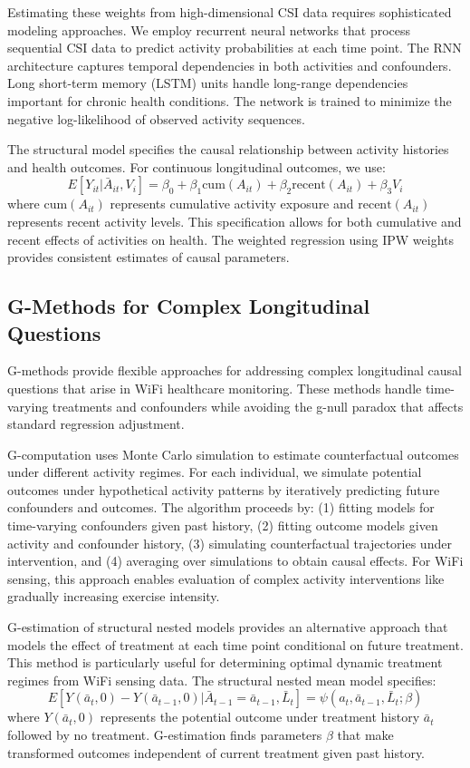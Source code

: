 \documentclass[journal]{IEEEtran}
\begin{document}
Estimating these weights from high-dimensional CSI data requires sophisticated modeling approaches. We employ recurrent neural networks that process sequential CSI data to predict activity probabilities at each time point. The RNN architecture captures temporal dependencies in both activities and confounders. Long short-term memory (LSTM) units handle long-range dependencies important for chronic health conditions. The network is trained to minimize the negative log-likelihood of observed activity sequences.

The structural model specifies the causal relationship between activity histories and health outcomes. For continuous longitudinal outcomes, we use:
$$E[Y_{it} | \bar{A}_{it}, V_i] = \beta_0 + \beta_1 \text{cum}(A_{it}) + \beta_2 \text{recent}(A_{it}) + \beta_3 V_i$$
where $\text{cum}(A_{it})$ represents cumulative activity exposure and $\text{recent}(A_{it})$ represents recent activity levels. This specification allows for both cumulative and recent effects of activities on health. The weighted regression using IPW weights provides consistent estimates of causal parameters.

\subsection{G-Methods for Complex Longitudinal Questions}

G-methods provide flexible approaches for addressing complex longitudinal causal questions that arise in WiFi healthcare monitoring. These methods handle time-varying treatments and confounders while avoiding the g-null paradox that affects standard regression adjustment.

G-computation uses Monte Carlo simulation to estimate counterfactual outcomes under different activity regimes. For each individual, we simulate potential outcomes under hypothetical activity patterns by iteratively predicting future confounders and outcomes. The algorithm proceeds by: (1) fitting models for time-varying confounders given past history, (2) fitting outcome models given activity and confounder history, (3) simulating counterfactual trajectories under intervention, and (4) averaging over simulations to obtain causal effects. For WiFi sensing, this approach enables evaluation of complex activity interventions like gradually increasing exercise intensity.

G-estimation of structural nested models provides an alternative approach that models the effect of treatment at each time point conditional on future treatment. This method is particularly useful for determining optimal dynamic treatment regimes from WiFi sensing data. The structural nested mean model specifies:
$$E[Y(\bar{a}_t, 0) - Y(\bar{a}_{t-1}, 0) | \bar{A}_{t-1} = \bar{a}_{t-1}, \bar{L}_t] = \psi(a_t, \bar{a}_{t-1}, \bar{L}_t; \beta)$$
where $Y(\bar{a}_t, 0)$ represents the potential outcome under treatment history $\bar{a}_t$ followed by no treatment. G-estimation finds parameters $\beta$ that make transformed outcomes independent of current treatment given past history.
\end{document}
